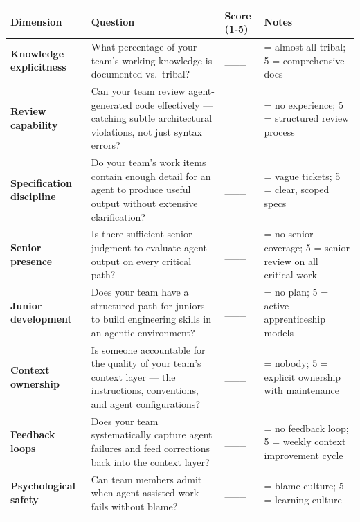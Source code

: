 \documentclass[
  a4paper,
  DIV=11,
  numbers=noendperiod]{scrreprt}
\newcounter{none} %
\begin{document}
{\def\LTcaptype{none} %
\begin{longtable}[]{@{}
  >{\raggedright\arraybackslash}p{}
  >{\raggedright\arraybackslash}p{}
  >{\raggedright\arraybackslash}p{}
  >{\raggedright\arraybackslash}p{}@{}}
\toprule\noalign{}
\begin{minipage}[b]{\linewidth}\raggedright
Dimension
\end{minipage} & \begin{minipage}[b]{\linewidth}\raggedright
Question
\end{minipage} & \begin{minipage}[b]{\linewidth}\raggedright
Score (1-5)
\end{minipage} & \begin{minipage}[b]{\linewidth}\raggedright
Notes
\end{minipage} \\
\midrule\noalign{}
\endhead
\bottomrule\noalign{}
\endlastfoot
\textbf{Knowledge explicitness} & What percentage of your team's working
knowledge is documented vs.~tribal? & \_\_\_ & 1 = almost all tribal; 5
= comprehensive docs \\
\textbf{Review capability} & Can your team review agent-generated code
effectively --- catching subtle architectural violations, not just
syntax errors? & \_\_\_ & 1 = no experience; 5 = structured review
process \\
\textbf{Specification discipline} & Do your team's work items contain
enough detail for an agent to produce useful output without extensive
clarification? & \_\_\_ & 1 = vague tickets; 5 = clear, scoped specs \\
\textbf{Senior presence} & Is there sufficient senior judgment to
evaluate agent output on every critical path? & \_\_\_ & 1 = no senior
coverage; 5 = senior review on all critical work \\
\textbf{Junior development} & Does your team have a structured path for
juniors to build engineering skills in an agentic environment? & \_\_\_
& 1 = no plan; 5 = active apprenticeship models \\
\textbf{Context ownership} & Is someone accountable for the quality of
your team's context layer --- the instructions, conventions, and agent
configurations? & \_\_\_ & 1 = nobody; 5 = explicit ownership with
maintenance \\
\textbf{Feedback loops} & Does your team systematically capture agent
failures and feed corrections back into the context layer? & \_\_\_ & 1
= no feedback loop; 5 = weekly context improvement cycle \\
\textbf{Psychological safety} & Can team members admit when
agent-assisted work fails without blame? & \_\_\_ & 1 = blame culture; 5
= learning culture \\
\end{longtable}
}
\end{document}

